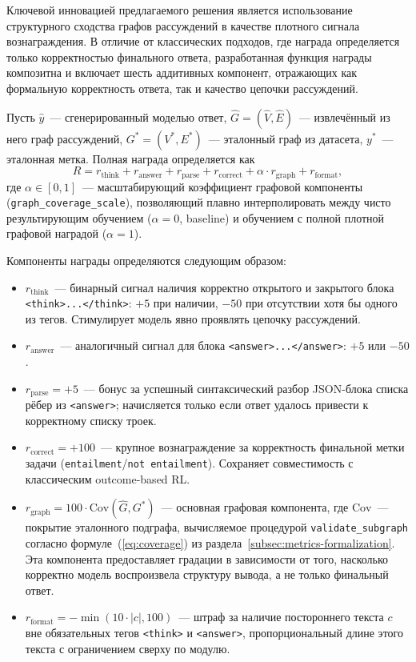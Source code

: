 Ключевой инновацией предлагаемого решения является использование структурного сходства графов рассуждений в качестве плотного сигнала вознаграждения. В отличие от классических подходов, где награда определяется только корректностью финального ответа, разработанная функция награды композитна и включает шесть аддитивных компонент, отражающих как формальную корректность ответа, так и качество цепочки рассуждений.

Пусть $\hat{y}$~--- сгенерированный моделью ответ, $\hat{G} = (\hat{V}, \hat{E})$~--- извлечённый из него граф рассуждений, $G^* = (V^*, E^*)$~--- эталонный граф из датасета, $y^*$~--- эталонная метка. Полная награда определяется как
\begin{equation}
\label{eq:reward-total}
R = r_{\text{think}} + r_{\text{answer}} + r_{\text{parse}} + r_{\text{correct}} + \alpha \cdot r_{\text{graph}} + r_{\text{format}},
\end{equation}
где $\alpha \in [0, 1]$~--- масштабирующий коэффициент графовой компоненты (\texttt{graph\_coverage\_scale}), позволяющий плавно интерполировать между чисто результирующим обучением ($\alpha = 0$, baseline) и обучением с полной плотной графовой наградой ($\alpha = 1$).

Компоненты награды определяются следующим образом:
\begin{itemize}
    \setlength{\itemsep}{\smallskipamount}
    \item $r_{\text{think}}$~--- бинарный сигнал наличия корректно открытого и закрытого блока \texttt{<think>...</think>}: $+5$ при наличии, $-50$ при отсутствии хотя бы одного из тегов. Стимулирует модель явно проявлять цепочку рассуждений.
    \item $r_{\text{answer}}$~--- аналогичный сигнал для блока \texttt{<answer>...</answer>}: $+5$ или $-50$.
    \item $r_{\text{parse}} = +5$~--- бонус за успешный синтаксический разбор JSON-блока списка рёбер из \texttt{<answer>}; начисляется только если ответ удалось привести к корректному списку троек.
    \item $r_{\text{correct}} = +100$~--- крупное вознаграждение за корректность финальной метки задачи (\texttt{entailment}/\texttt{not entailment}). Сохраняет совместимость с классическим outcome-based RL.
    \item $r_{\text{graph}} = 100 \cdot \mathrm{Cov}(\hat{G}, G^*)$~--- основная графовая компонента, где $\mathrm{Cov}$~--- покрытие эталонного подграфа, вычисляемое процедурой \texttt{validate\_subgraph} согласно формуле~(\ref{eq:coverage}) из раздела~\ref{subsec:metrics-formalization}. Эта компонента предоставляет градации в зависимости от того, насколько корректно модель воспроизвела структуру вывода, а не только финальный ответ.
    \item $r_{\text{format}} = -\min(10 \cdot |c|, 100)$~--- штраф за наличие постороннего текста $c$ вне обязательных тегов \texttt{<think>} и \texttt{<answer>}, пропорциональный длине этого текста с ограничением сверху по модулю.
\end{itemize}

